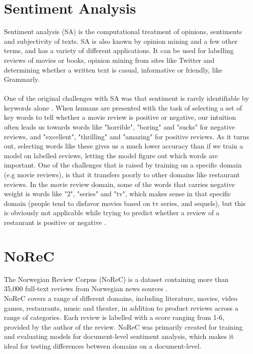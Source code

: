 \documentclass{report}
\begin{document}
\section{Sentiment Analysis}
Sentiment analysis (SA) is the computational treatment of opinions, sentiments and subjectivity of texts. SA is also known by opinion mining and a few other terms, and has a variety of different applications. It can be used for labelling reviews of movies or books, opinion mining from sites like Twitter and determining whether a written text is casual, informative or friendly, like Grammarly.\\\\
One of the original challenges with SA was that sentiment is rarely identifiable by keywords alone \cite{pang-etal-2002-thumbs}. When humans are presented with the task of selecting a set of key words to tell whether a movie review is positive or negative, our intuition often leads us towards words like "horrible", "boring" and "sucks" for negative reviews, and "excellent", "thrilling" and "amazing" for positive reviews. As it turns out, selecting words like these gives us a much lower accuracy than if we train a model on labelled reviews, letting the model figure out which words are important. One of the challenges that is raised by training on a specific domain (e.g movie reviews), is that it transfers poorly to other domains like restaurant reviews. In the movie review domain, some of the words that carries negative weight is words like "2", "series" and "tv", which makes sense in that specific domain (people tend to disfavor movies based on tv series, and sequels), but this is obviously not applicable while trying to predict whether a review of a restaurant is positive or negative \cite{taboada-etal-2011-lexicon}.
%

\section{NoReC}
The Norwegian Review Corpus (NoReC) is a dataset containing more than 35,000 full-text reviews from Norwegian news sources \cite{11509/124}.\\
NoReC covers a range of different domains, including literature, movies, video games, restaurants, music and theater, in addition to product reviews across a range of categories. Each review is labelled with a score ranging from 1-6, provided by the author of the review. NoReC was primarily created for training and evaluating models for document-level sentiment analysis, which makes it ideal for testing differences between domains on a document-level.
\noindent
\end{document}

